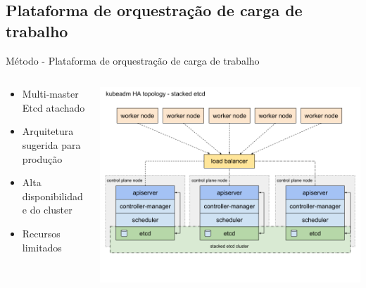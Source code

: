 \documentclass[10pt,brazil]{beamer}
\theoremstyle{definition}
\begin{document}
\subsection{Plataforma de orquestração de carga de trabalho}

\begin{frame}{Método - Plataforma de orquestração de carga de trabalho}
  \begin{columns}
    \begin{column}{0.5\textwidth}
      \begin{itemize}
        \item Multi-master Etcd atachado \cite{kubernetes2022, etcd2022}
        \item Arquitetura sugerida para produção
        \item Alta disponibilidade do cluster
        \item Recursos limitados
      \end{itemize}
    \end{column}
    \begin{column}{0.5\textwidth}  %
      \begin{center}
        \includegraphics[width=1\textwidth]{kubeadm-ha-topology-stacked-etcd.png}
      \end{center}
    \end{column}
  \end{columns}
\end{frame}
\end{document}
